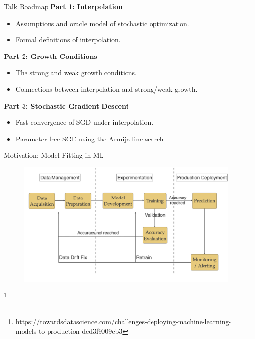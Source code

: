 \documentclass[mathserif,notheorems, hyperref={colorlinks, citecolor=blue, urlcolor=blue, linkcolor=blue}]{beamer}
\newcommand{\source}[1]{{\let\thefootnote\relax\footnote{{\tiny #1}}}}
\begin{document}
    \begin{frame}{Talk Roadmap}
        \textbf{Part 1: Interpolation}
        \begin{itemize}
            \item Assumptions and oracle model of stochastic optimization.
            \item Formal definitions of interpolation.
        \end{itemize}

        \vspace{2ex}
        
        \textbf{Part 2: Growth Conditions}
        \begin{itemize}
            \item The strong and weak growth conditions. 
            \item Connections between interpolation and strong/weak growth.
        \end{itemize}
        
        \vspace{2ex}

        \textbf{Part 3: Stochastic Gradient Descent}
        \begin{itemize}
            \item Fast convergence of SGD under interpolation. 
            \item Parameter-free SGD using the Armijo line-search.
        \end{itemize}
    \end{frame}

    \begin{frame}{Motivation: Model Fitting in ML}
       
       \begin{figure}
            \centering
            \includegraphics[width=0.98\textwidth]{figures/workflow} 
       \end{figure} 

       \source{https://towardsdatascience.com/challenges-deploying-machine-learning-models-to-production-ded3f9009cb3}
    \end{frame}
\end{document}

